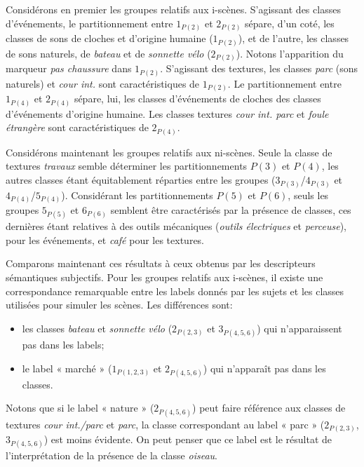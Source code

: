 Considérons en premier les groupes relatifs aux i-scènes. S'agissant des classes d'événements, le partitionnement entre $1_{P(2)}$ et $2_{P(2)}$ sépare, d'un coté, les classes de sons de cloches et d'origine humaine ($1_{P(2)}$), et de l'autre, les classes de sons naturels, de \emph{bateau} et de \emph{sonnette vélo} ($2_{P(2)}$). Notons l'apparition du marqueur \emph{pas chaussure} dans $1_{P(2)}$. S'agissant des textures, les classes \emph{parc} (sons naturels) et \emph{cour int.} sont caractéristiques de $1_{P(2)}$. Le partitionnement entre $1_{P(4)}$ et $2_{P(4)}$ sépare, lui, les classes d'événements de cloches des classes d'événements d'origine humaine. Les classes textures \emph{cour int. parc} et \emph{foule étrangère} sont caractéristiques de $2_{P(4)}$.

Considérons maintenant les groupes relatifs aux ni-scènes. Seule la classe de textures \emph{travaux} semble déterminer les partitionnements $P(3)$ et $P(4)$, les autres classes étant équitablement réparties entre les groupes ($3_{P(3)}$/$4_{P(3)}$ et $4_{P(4)}$/$5_{P(4)}$). Considérant les partitionnements $P(5)$ et $P(6)$, seuls les groupes $5_{P(5)}$ et $6_{P(6)}$ semblent être caractérisés par la présence de classes, ces dernières étant relatives à des outils mécaniques (\emph{outils électriques} et \emph{perceuse}), pour les événements, et \emph{café} pour les textures.

Comparons maintenant ces résultats à ceux obtenus par les descripteurs sémantiques subjectifs. Pour les groupes relatifs aux i-scènes, il existe une correspondance remarquable entre les labels donnés par les sujets et les classes utilisées pour simuler les scènes. Les différences sont:

\begin{itemize}
\item les classes \emph{bateau} et \emph{sonnette vélo} ($2_{P(2,3)}$ et $3_{P(4,5,6)}$) qui n’apparaissent pas dans les labels;
\item le label « marché » ($1_{P(1,2,3)}$ et $2_{P(4,5,6)}$) qui n'apparaît pas dans les classes.
\end{itemize} 

Notons que si le label « nature » ($2_{P(4,5,6)}$) peut faire référence aux classes de textures \emph{cour int./parc} et \emph{parc}, la classe correspondant au label « parc » ($2_{P(2,3)}$, $3_{P(4,5,6)}$) est moins évidente. On peut penser que ce label est le résultat de l'interprétation de la présence de la classe \emph{oiseau}.

